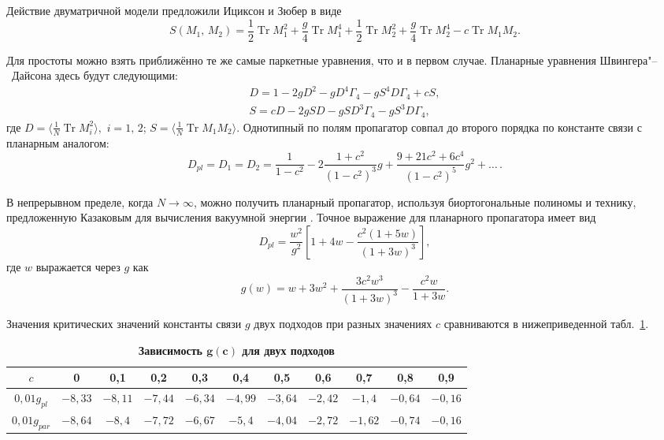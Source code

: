  Действие двуматричной модели предложили Ициксон и Зюбер\cite{shish:iz} в виде
\begin{equation}
S(M_1,\,M_2)=\frac{1}{2} \mathop{\mathrm{Tr}}\nolimits  M_1^2+\frac{g}{4} \mathop{\mathrm{Tr}}\nolimits   M_1^4+\frac{1}{2}
\mathop{\mathrm{Tr}}\nolimits  M_2^2+ \frac{g}{4} \mathop{\mathrm{Tr}}\nolimits  M_2^4 - c \mathop{\mathrm{Tr}}\nolimits  M_1 M_2.
\end{equation}

Для простоты можно взять приближённо те же самые паркетные уравнения, что и в первом случае. Планарные уравнения Швингера"--~Дайсона
\cite{shish:sh2} здесь будут следующими:
\begin{gather*}
D=1-2gD^2 - gD^4\Gamma_4-gS^4D\Gamma_4+cS, \\
S=cD-2gSD-gSD^3\Gamma_4-gS^3D\Gamma_4,
\end{gather*}
где
$
D=\langle \frac{1}{N}\mathop{\mathrm{Tr}}\nolimits   M_i^2\rangle,$ $i=1, \,2$; $S=\langle\frac{1}{N}\mathop{\mathrm{Tr}}\nolimits  M_1M_2\rangle.$
Однотипный по полям пропагатор совпал до второго порядка по
константе связи с планарным аналогом:
\begin{equation*}
D_{pl}=D_1=D_2=\frac{1}{1-c^2}-2\frac{1+c^2}{(1-c^2)^3}
g+\frac{9+21c^2+6c^4} {(1-c^2)^5} g^2+\ldots\, .
\end{equation*}

В непрерывном пределе, когда $N\to \infty$, можно получить
планарный пропагатор, используя биортогональные полиномы
 и технику, предложенную Казаковым   для
вычисления вакуумной энергии \cite{shish:kaz}. Точное выражение для планарного пропагатора имеет вид
\begin{equation*}
D_{pl}=\frac{w^2}{g^2}\left[1+4w-\frac{c^2(1+5w)}{(1+3w)^3} \right],
\end{equation*}
где $w$ выражается через $g$ как
\begin{equation*}
g(w)=w+3w^2+\frac{3c^2w^3}{(1+3w)^3}-\frac{c^2 w}{1+3w}.
\end{equation*}

Значения критических значений константы связи $g$ двух подходов
при разных значениях $c$ сравниваются в нижеприведенной табл.~\ref{sisk:2}.

\begin{table}[h!]
\setlength{\tabcolsep}{4pt}
\centering \small
\caption{\bf Зависимость $\boldsymbol{g(c)}$ для двух подходов\label{sisk:2}} \vspace{-3mm}
\begin{tabular}{c|cccccccccc} \hline
\scriptsize $c$ & \scriptsize0 &\scriptsize 0,1 & \scriptsize0,2 & \scriptsize0,3 & \scriptsize0,4 & \scriptsize0,5 & \scriptsize0,6 & \scriptsize0,7 & \scriptsize0,8 & \scriptsize0,9 \\
 \hline
 \rule{0mm}{12pt}%
\scriptsize $0,01 g_{pl}$  & $-8,33$ & $-8,11$ & $-7,44$ & $-6,34$ & $-4,99$ & $-3,64$ & $-2,42$ &  $-1,4$ & $-0,64$ & $-0,16$ \\
\scriptsize $0,01 g_{par}$ & $-8,64$ & $-8,4$ & $-7,72$ & $-6,67$ & $-5,4$ & $-4,04$ & $-2,72$ &  $-1,62$ & $-0,74$ & $-0,16$ \\
\hline
 \end{tabular}
\end{table}

